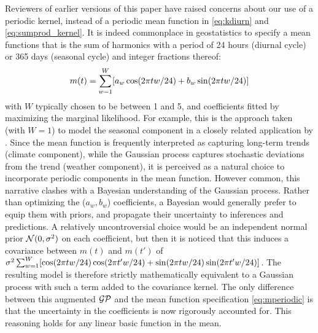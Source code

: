 Reviewers of earlier versions of this paper have raised concerns about our use of a periodic kernel,
instead of a periodic mean function in \autoref{eq:kdiurn} and \autoref{eq:sumprod_kernel}.
It is indeed commonplace in geostatistics to specify a mean functions that is the sum of harmonics
with a period of 24 hours (diurnal cycle) or 365 days (seasonal cycle) and integer fractions thereof:
\begin{equation}
    m(t) = \sum_{w=1}^W \sbr{a_w \cos(2\pi t w / 24) + b_w \sin(2\pi t w / 24)}
    \label{eq:mperiodic}
\end{equation}
with $W$ typically chosen to be between 1 and 5, and coefficients fitted by maximizing the marginal likelihood.
For example, this is the approach taken (with $W=1$) to model the seasonal component in a closely related application by \citet{kleiber2013daily}.
Since the mean function is frequently interpreted as capturing long-term trends (climate component), while the Gaussian process captures stochastic deviations from the trend (weather component), it is perceived as a natural choice to incorporate periodic components in the mean function.
However common, this narrative clashes with a Bayesian understanding of the Gaussian process.
Rather than optimizing the ($a_w,b_w$) coefficients, a Bayesian would generally prefer to equip them with priors,
and propagate their uncertainty to inferences and predictions.
A relatively uncontroversial choice would be an independent normal prior $\operatorname{\mathcal{N}}(0, \sigma^2)$ on each coefficient, 
but then it is noticed that this induces a covariance between $m(t)$ and $m(t')$ of 
$\sigma^2 \sum_{w=1}^W 
        \sbr{
            \cos(2\pi t w / 24) \cos(2\pi t' w / 24) + 
            \sin(2\pi t w / 24) \sin(2\pi t' w / 24)
            }$.
The resulting model is therefore strictly mathematically equivalent to a Gaussian process
with such a term added to the covariance kernel.
The only difference between this augmented $\operatorname{\mathcal{GP}}$ 
and the mean function specification \autoref{eq:mperiodic} is that the 
uncertainty in the coefficients is now rigorously accounted for.
This reasoning holds for any linear basic function in the mean.

